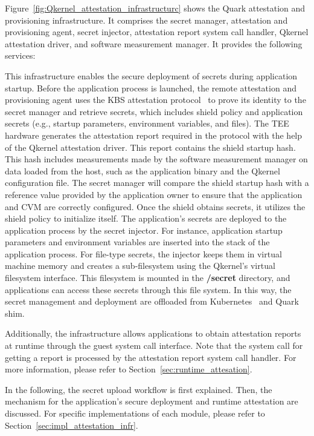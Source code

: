 Figure~\ref{fig:Qkernel_attestation_infrastructurc} shows the Quark attestation and provisioning infrastructure. It comprises the secret manager, attestation and provisioning agent, secret injector, attestation report system call handler, Qkernel attestation driver, and software measurement manager. It provides the following services:


This infrastructure enables the secure deployment of secrets during application startup. Before the application process is launched, the remote attestation and provisioning agent uses the KBS attestation protocol~\cite*{kbs_Attestation_protocol} to prove its identity to the secret manager and retrieve secrets, which includes shield policy and application 
secrets (e.g., startup parameters, environment variables, and files). The TEE hardware generates the attestation report required in the protocol with the help of the Qkernel attestation driver. This report contains the shield startup hash. This hash includes measurements made by the software measurement manager on data loaded from the host, such as 
the application binary and the Qkernel configuration file. The secret manager will compare the shield startup hash with a reference value provided by the application owner to ensure that the application and CVM are correctly configured. Once the shield obtains secrets, it utilizes the shield policy to initialize itself. The application’s secrets are 
deployed to the application process by the secret injector. For instance, application startup parameters and environment variables are inserted into the stack of the application process. For file-type secrets, the injector keeps them in virtual machine memory and creates a sub-filesystem using the Qkernel’s virtual filesystem interface. This filesystem is 
mounted in the \textbf{/secret} directory, and applications can access these secrets through this file system. In this way, the secret management and deployment are offloaded from Kubernetes~\cite*{k8s} and Quark shim.


Additionally, the infrastructure allows applications to obtain attestation reports at runtime through the guest system call interface. Note that the system call for getting a report is processed by the attestation report system call handler. For more information, please refer to Section~\ref{sec:runtime_attesation}.

In the following, the secret upload workflow is first explained. Then, the mechanism for the application’s secure deployment and runtime attestation are discussed. For specific implementations of each module, please refer to Section~\ref{sec:impl_attestation_infr}.




